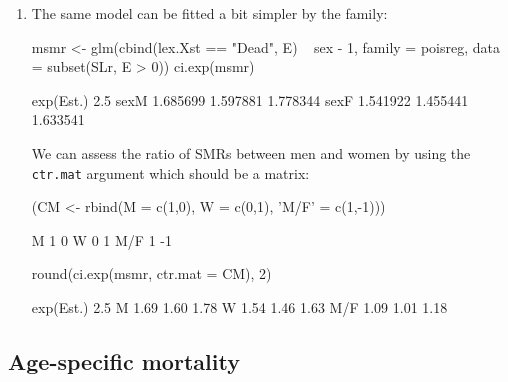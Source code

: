 \begin{enumerate}[resume]
\item The same model can be fitted a bit simpler by the  family:
\begin{Schunk}
\begin{Sinput}
 msmr <- glm(cbind(lex.Xst == "Dead", E) ~ sex - 1,
             family = poisreg,
               data = subset(SLr, E > 0))
 ci.exp(msmr)
\end{Sinput}
\begin{Soutput}
     exp(Est.)     2.5%    97.5%
sexM  1.685699 1.597881 1.778344
sexF  1.541922 1.455441 1.633541
\end{Soutput}
\end{Schunk}
  We can assess the ratio of SMRs between men and women by using the
  \texttt{ctr.mat} argument which should be a matrix:
\begin{Schunk}
\begin{Sinput}
 (CM <- rbind(M = c(1,0),
              W = c(0,1),
          'M/F' = c(1,-1)))
\end{Sinput}
\begin{Soutput}
    [,1] [,2]
M      1    0
W      0    1
M/F    1   -1
\end{Soutput}
\begin{Sinput}
 round(ci.exp(msmr, ctr.mat = CM), 2)
\end{Sinput}
\begin{Soutput}
    exp(Est.) 2.5% 97.5%
M        1.69 1.60  1.78
W        1.54 1.46  1.63
M/F      1.09 1.01  1.18
\end{Soutput}
\end{Schunk}

\end{enumerate}

\subsection*{Age-specific mortality}

